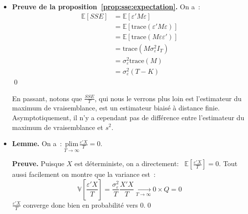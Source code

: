 \documentclass[10pt]{beamer}
\begin{document}
\begin{notes}
  \begin{itemize}

  \item \textbf{Preuve de la proposition~\ref{prop:sse:expectation}.} On a~:
    \[
      \begin{split}
        \mathbb E[SSE] &= \mathbb E [\varepsilon' M \varepsilon]\\
                       &= \mathbb E \left[\mathrm{trace}\left( \varepsilon' M \varepsilon \right)\right]\\
                       &= \mathbb E \left[\mathrm{trace}\left( M \varepsilon\varepsilon'  \right)\right]\\
                       &= \mathrm{trace}\left( M \sigma_{\varepsilon}^2 I_T  \right)\\
                       &= \sigma_{\varepsilon}^2\mathrm{trace}\left( M\right)\\
                       &= \sigma_{\varepsilon}^2(T-K)
      \end{split}
    \]
\qed

\medskip

En passant, notons que $\frac{SSE}{T}$, qui nous le verrons plus loin est l'estimateur du maximum de vraisemblance, est un estimateur biaisé à distance finie. Asymptotiquement, il n'y a cependant pas de différence entre l'estimateur du maximum de vraisemblance et $s^2$.\newline

\medskip
\item \textbf{Lemme.} On a~: $\underset{T\to\infty}{\mathrm{plim}} \frac{\varepsilon'X}{T} = 0$.\newline\newline

  \textbf{Preuve.} Puisque $X$ est déterministe, on a directement:~ $\mathbb E \left[ \frac{\varepsilon'X}{T} \right] = 0$. Tout aussi facilement on montre que la variance est~:
  \[
    \mathbb V \left[ \frac{\varepsilon'X}{T} \right] = \frac{\sigma_{\varepsilon}^2}{T}\frac{X'X}{T}\underset{T\to\infty}{\longrightarrow} 0 \times Q=0
  \]
$\frac{\varepsilon 'X}{T}$ converge donc bien en probabilité vers 0.\qed

\pagebreak


\end{itemize}
\end{notes}
\end{document}

